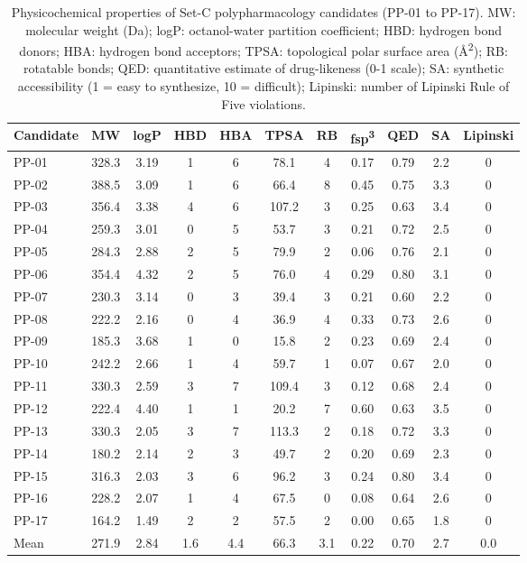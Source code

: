 \begin{table}[h!]
\centering
\caption{Physicochemical properties of Set-C polypharmacology candidates (PP-01 to PP-17). MW: molecular weight (Da); logP: octanol-water partition coefficient; HBD: hydrogen bond donors; HBA: hydrogen bond acceptors; TPSA: topological polar surface area (\si{\angstrom\squared}); RB: rotatable bonds; QED: quantitative estimate of drug-likeness (0-1 scale); SA: synthetic accessibility (1 = easy to synthesize, 10 = difficult); Lipinski: number of Lipinski Rule of Five violations.}
\label{tab:physichem}
\small
\begin{tabular}{lcccccccccc}
\toprule
Candidate & MW & logP & HBD & HBA & TPSA & RB & fsp\textsuperscript{3} & QED & SA & Lipinski \\
\midrule
PP-01 & 328.3 & 3.19 & 1 & 6 & 78.1 & 4 & 0.17 & 0.79 & 2.2 & 0 \\
PP-02 & 388.5 & 3.09 & 1 & 6 & 66.4 & 8 & 0.45 & 0.75 & 3.3 & 0 \\
PP-03 & 356.4 & 3.38 & 4 & 6 & 107.2 & 3 & 0.25 & 0.63 & 3.4 & 0 \\
PP-04 & 259.3 & 3.01 & 0 & 5 & 53.7 & 3 & 0.21 & 0.72 & 2.5 & 0 \\
PP-05 & 284.3 & 2.88 & 2 & 5 & 79.9 & 2 & 0.06 & 0.76 & 2.1 & 0 \\
PP-06 & 354.4 & 4.32 & 2 & 5 & 76.0 & 4 & 0.29 & 0.80 & 3.1 & 0 \\
PP-07 & 230.3 & 3.14 & 0 & 3 & 39.4 & 3 & 0.21 & 0.60 & 2.2 & 0 \\
PP-08 & 222.2 & 2.16 & 0 & 4 & 36.9 & 4 & 0.33 & 0.73 & 2.6 & 0 \\
PP-09 & 185.3 & 3.68 & 1 & 0 & 15.8 & 2 & 0.23 & 0.69 & 2.4 & 0 \\
PP-10 & 242.2 & 2.66 & 1 & 4 & 59.7 & 1 & 0.07 & 0.67 & 2.0 & 0 \\
PP-11 & 330.3 & 2.59 & 3 & 7 & 109.4 & 3 & 0.12 & 0.68 & 2.4 & 0 \\
PP-12 & 222.4 & 4.40 & 1 & 1 & 20.2 & 7 & 0.60 & 0.63 & 3.5 & 0 \\
PP-13 & 330.3 & 2.05 & 3 & 7 & 113.3 & 2 & 0.18 & 0.72 & 3.3 & 0 \\
PP-14 & 180.2 & 2.14 & 2 & 3 & 49.7 & 2 & 0.20 & 0.69 & 2.3 & 0 \\
PP-15 & 316.3 & 2.03 & 3 & 6 & 96.2 & 3 & 0.24 & 0.80 & 3.4 & 0 \\
PP-16 & 228.2 & 2.07 & 1 & 4 & 67.5 & 0 & 0.08 & 0.64 & 2.6 & 0 \\
PP-17 & 164.2 & 1.49 & 2 & 2 & 57.5 & 2 & 0.00 & 0.65 & 1.8 & 0 \\
\midrule
Mean & 271.9 & 2.84 & 1.6 & 4.4 & 66.3 & 3.1 & 0.22 & 0.70 & 2.7 & 0.0 \\
\bottomrule
\end{tabular}
\end{table}